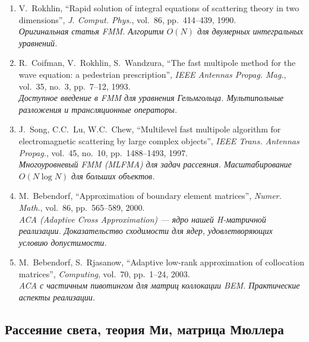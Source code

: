 \documentclass[12pt,a4paper]{article}
\begin{document}
\begin{enumerate}[resume]
  \item V.~Rokhlin, ``Rapid solution of integral equations of scattering theory in two dimensions'', \textit{J. Comput. Phys.}, vol.~86, pp.~414--439, 1990.
  \\ \textit{Оригинальная статья FMM. Алгоритм $O(N)$ для двумерных интегральных уравнений.}

  \item R.~Coifman, V.~Rokhlin, S.~Wandzura, ``The fast multipole method for the wave equation: a pedestrian prescription'', \textit{IEEE Antennas Propag. Mag.}, vol.~35, no.~3, pp.~7--12, 1993.
  \\ \textit{Доступное введение в FMM для уравнения Гельмгольца. Мультипольные разложения и трансляционные операторы.}

  \item J.~Song, C.C.~Lu, W.C.~Chew, ``Multilevel fast multipole algorithm for electromagnetic scattering by large complex objects'', \textit{IEEE Trans. Antennas Propag.}, vol.~45, no.~10, pp.~1488--1493, 1997.
  \\ \textit{Многоуровневый FMM (MLFMA) для задач рассеяния. Масштабирование $O(N \log N)$ для больших объектов.}

  \item M.~Bebendorf, ``Approximation of boundary element matrices'', \textit{Numer. Math.}, vol.~86, pp.~565--589, 2000.
  \\ \textit{ACA (Adaptive Cross Approximation) --- ядро нашей H-матричной реализации. Доказательство сходимости для ядер, удовлетворяющих условию допустимости.}

  \item M.~Bebendorf, S.~Rjasanow, ``Adaptive low-rank approximation of collocation matrices'', \textit{Computing}, vol.~70, pp.~1--24, 2003.
  \\ \textit{ACA с частичным пивотингом для матриц коллокации BEM. Практические аспекты реализации.}
\end{enumerate}

\subsection{Рассеяние света, теория Ми, матрица Мюллера}
\end{document}
